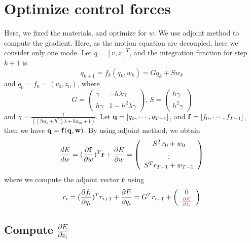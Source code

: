 \documentclass[9pt,twocolumn]{extarticle}
\newcommand{\RED}[1]{\textcolor{red}{#1}}
\begin{document}
\section{Optimize control forces}
Here, we fixed the materials, and optimize for $w$.  We use adjoint method to
compute the gradient. Here, as the motion equation are decoupled, here we
consider only one mode. Let $q = [v,z]^T$, and the integration function for step
$k+1$ is
\begin{equation} \label{mq2}
  q_{k+1} = f_k(q_k,w_k) = Gq_{k} + Sw_{k}
\end{equation}
and $q_0 = f_0 = (v_0,z_0)$, where
\begin{equation} \label{ab}
  G = \left( \begin{array}{cc}
      \gamma&-h\lambda \gamma \\
      h \gamma& 1-h^2\lambda \gamma
    \end{array} \right) \mbox{, }
  S = \left( \begin{array}{c}
      h\gamma\\
      h^2\gamma
    \end{array} \right)
\end{equation}
and $\gamma = \frac{1}{((h \alpha_k + h^2)\lambda + h \alpha_m + 1)}$.  Let
$\bold{q} = [q_0,\cdots,q_{T-1}]$, and $\bold{f} = [f_0,\cdots,f_{T-1}]$, then
we have $\bold{q} = \bold{f}(\bold{q},\bold{w})$. By using adjoint method, we
obtain
\begin{equation} \label{grad}
  \frac{dE}{dw} = (\frac{\partial{\bold{f}}}{\partial{w}})^T\bold{r} +
  \frac{\partial{E}}{\partial{w}} =
  \left( \begin{array}{c}
      S^Tr_0 + w_0\\
      \vdots\\
      S^Tr_{T-1} + w_{T-1}
    \end{array} \right)
\end{equation}
where we compute the adjoint vector $\bold{r}$ using
\begin{equation} \label{ad}
  r_{i} = (\frac{\partial{f_i}}{\partial{q_i}})^Tr_{i+1} +
  \frac{\partial{E}}{\partial{q_i}} = 
  G^Tr_{i+1} + \left( \begin{array}{c}
      0\\
      \RED {\frac{\partial{E}}{\partial{z_i}}}
    \end{array} \right)
\end{equation}

\subsection{Compute ${\frac{\partial{E}}{\partial{z_i}}}$} 
\end{document}
